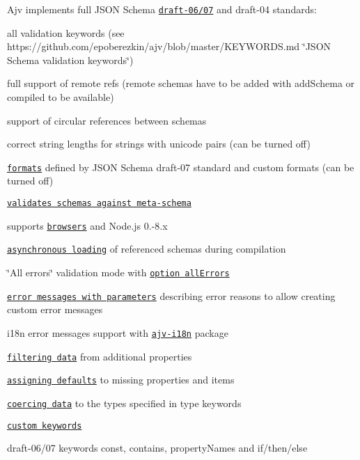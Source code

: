 \begin{DoxyItemize}
\item Ajv implements full J\+S\+ON Schema \href{http://json-schema.org/}{\tt draft-\/06/07} and draft-\/04 standards\+:
\begin{DoxyItemize}
\item all validation keywords (see https\+://github.com/epoberezkin/ajv/blob/master/\+K\+E\+Y\+W\+O\+R\+D\+S.\+md \char`\"{}\+J\+S\+O\+N Schema validation keywords\char`\"{})
\item full support of remote refs (remote schemas have to be added with {\ttfamily add\+Schema} or compiled to be available)
\item support of circular references between schemas
\item correct string lengths for strings with unicode pairs (can be turned off)
\item \href{#formats}{\tt formats} defined by J\+S\+ON Schema draft-\/07 standard and custom formats (can be turned off)
\item \href{#api-validateschema}{\tt validates schemas against meta-\/schema}
\end{DoxyItemize}
\item supports \href{#using-in-browser}{\tt browsers} and Node.\+js 0.-\/8.\+x
\item \href{#asynchronous-schema-compilation}{\tt asynchronous loading} of referenced schemas during compilation
\item \char`\"{}\+All errors\char`\"{} validation mode with \href{#options}{\tt option all\+Errors}
\item \href{#validation-errors}{\tt error messages with parameters} describing error reasons to allow creating custom error messages
\item i18n error messages support with \href{https://github.com/epoberezkin/ajv-i18n}{\tt ajv-\/i18n} package
\item \href{#filtering-data}{\tt filtering data} from additional properties
\item \href{#assigning-defaults}{\tt assigning defaults} to missing properties and items
\item \href{#coercing-data-types}{\tt coercing data} to the types specified in {\ttfamily type} keywords
\item \href{#defining-custom-keywords}{\tt custom keywords}
\item draft-\/06/07 keywords {\ttfamily const}, {\ttfamily contains}, {\ttfamily property\+Names} and {\ttfamily if/then/else}

\end{DoxyItemize}
